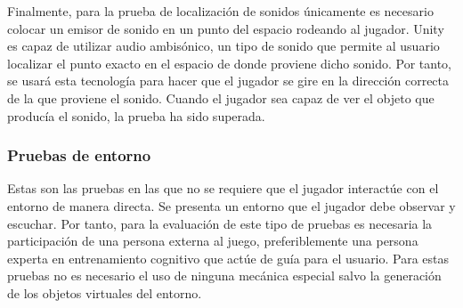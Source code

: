 Finalmente, para la prueba de localización de sonidos únicamente es necesario colocar un emisor de sonido en un punto del espacio rodeando al jugador. Unity es capaz de utilizar audio ambisónico, un tipo de sonido que permite al usuario localizar el punto exacto en el espacio de donde proviene dicho sonido. Por tanto, se usará esta tecnología para hacer que el jugador se gire en la dirección correcta de la que proviene el sonido. Cuando el jugador sea capaz de ver el objeto que producía el sonido, la prueba ha sido superada. 


\subsubsection{Pruebas de entorno}


Estas son las pruebas en las que no se requiere que el jugador interactúe con el entorno de manera directa. Se presenta un entorno que el jugador debe observar y escuchar. Por tanto, para la evaluación de este tipo de pruebas es necesaria la participación de una persona externa al juego, preferiblemente una persona experta en entrenamiento cognitivo que actúe de guía para el usuario. Para estas pruebas no es necesario el uso de ninguna mecánica especial salvo la generación de los objetos virtuales del entorno.


